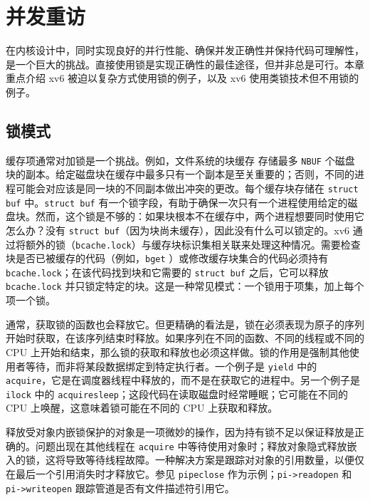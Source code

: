 \chapter{并发重访}
\label{CH:LOCK2}

在内核设计中，同时实现良好的并行性能、确保并发正确性并保持代码可理解性，是一个巨大的挑战。直接使用锁是实现正确性的最佳途径，但并非总是可行。本章重点介绍 xv6 被迫以复杂方式使用锁的例子，以及 xv6 使用类锁技术但不用锁的例子。

\section{锁模式}

缓存项通常对加锁是一个挑战。例如，文件系统的块缓存  存储最多 {\tt NBUF} 个磁盘块的副本。给定磁盘块在缓存中最多只有一个副本是至关重要的；否则，不同的进程可能会对应该是同一块的不同副本做出冲突的更改。每个缓存块存储在 {\tt struct buf}  中。{\tt struct buf} 有一个锁字段，有助于确保一次只有一个进程使用给定的磁盘块。然而，这个锁是不够的：如果块根本不在缓存中，两个进程想要同时使用它怎么办？没有 {\tt struct buf}（因为块尚未缓存），因此没有什么可以锁定的。xv6 通过将额外的锁（{\tt bcache.lock}）与缓存块标识集相关联来处理这种情况。需要检查块是否已被缓存的代码（例如，{\tt bget} ）或修改缓存块集合的代码必须持有 {\tt bcache.lock}；在该代码找到块和它需要的 {\tt struct buf} 之后，它可以释放 {\tt bcache.lock} 并只锁定特定的块。这是一种常见模式：一个锁用于项集，加上每个项一个锁。

通常，获取锁的函数也会释放它。但更精确的看法是，锁在必须表现为原子的序列开始时获取，在该序列结束时释放。如果序列在不同的函数、不同的线程或不同的 CPU 上开始和结束，那么锁的获取和释放也必须这样做。锁的作用是强制其他使用者等待，而非将某段数据绑定到特定执行者。一个例子是 {\tt yield} 中的 {\tt acquire}，它是在调度器线程中释放的，而不是在获取它的进程中。另一个例子是 {\tt ilock} 中的 {\tt acquiresleep}；这段代码在读取磁盘时经常睡眠；它可能在不同的 CPU 上唤醒，这意味着锁可能在不同的 CPU 上获取和释放。

释放受对象内嵌锁保护的对象是一项微妙的操作，因为持有锁不足以保证释放是正确的。问题出现在其他线程在 {\tt acquire} 中等待使用对象时；释放对象隐式释放嵌入的锁，这将导致等待线程故障。一种解决方案是跟踪对对象的引用数量，以便仅在最后一个引用消失时才释放它。参见 {\tt pipeclose}  作为示例；{\tt pi->readopen} 和 {\tt pi->writeopen} 跟踪管道是否有文件描述符引用它。

